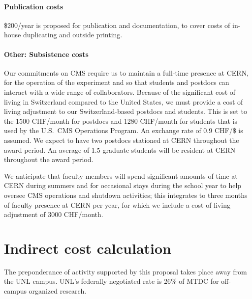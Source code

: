 \documentclass[11pt]{article}
\begin{document}

\paragraph{Publication costs} \$200/year is proposed for publication and
documentation, to cover costs of in-house duplicating and outside printing.

\paragraph{Other: Subsistence costs} Our commitments on CMS require us to
maintain a full-time presence at CERN, for the operation of the experiment
and so that students and postdocs can interact with a wide range of
collaborators.  Because of the significant cost of living in Switzerland
compared to the United States, we must provide a cost of living adjustment
to our Switzerland-based postdocs and students.  This is set to the 1500
CHF/month for postdocs and 1280 CHF/month for students that is used by the
U.S.~CMS Operations Program.  An exchange rate of 0.9 CHF/\$ is assumed.
We expect to have two postdocs stationed at CERN throughout the award
period.  An average of 1.5 graduate students will be resident at CERN
throughout the award period.

We anticipate that faculty members will spend significant amounts of time
at CERN during summers and for occasional stays during the school year to
help oversee CMS operations and shutdown activities; this integrates to three
months of faculty presence at CERN per year, for which we include a cost of
living adjustment of 3000 CHF/month.

\section{Indirect cost calculation} The preponderance of activity supported
by this proposal takes place away from the UNL campus. UNL's federally
negotiated rate is 26\% of MTDC for off-campus organized research.
\end{document}
